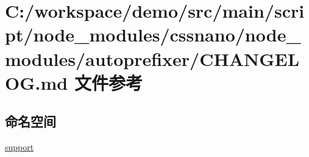 \hypertarget{cssnano_2node__modules_2autoprefixer_2_c_h_a_n_g_e_l_o_g_8md}{}\section{C\+:/workspace/demo/src/main/script/node\+\_\+modules/cssnano/node\+\_\+modules/autoprefixer/\+C\+H\+A\+N\+G\+E\+L\+OG.md 文件参考}
\label{cssnano_2node__modules_2autoprefixer_2_c_h_a_n_g_e_l_o_g_8md}
\subsection*{命名空间}
\begin{DoxyCompactItemize}
\item 
 \mbox{\hyperlink{namespacesupport}{support}}
\end{DoxyCompactItemize}
